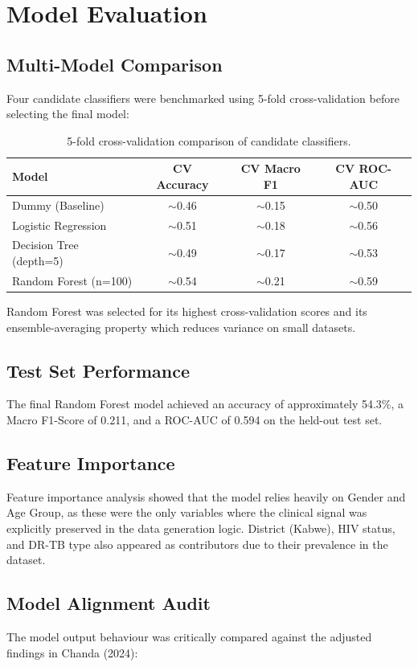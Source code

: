 \chapter{Model Evaluation}
\section{Multi-Model Comparison}
Four candidate classifiers were benchmarked using 5-fold cross-validation before selecting the final model:

\begin{table}[h!]
\centering
\begin{tabular}{lccc}
\toprule
\textbf{Model} & \textbf{CV Accuracy} & \textbf{CV Macro F1} & \textbf{CV ROC-AUC} \\
\midrule
Dummy (Baseline) & $\sim$0.46 & $\sim$0.15 & $\sim$0.50 \\
Logistic Regression & $\sim$0.51 & $\sim$0.18 & $\sim$0.56 \\
Decision Tree (depth=5) & $\sim$0.49 & $\sim$0.17 & $\sim$0.53 \\
Random Forest (n=100) & $\sim$0.54 & $\sim$0.21 & $\sim$0.59 \\
\bottomrule
\end{tabular}
\caption{5-fold cross-validation comparison of candidate classifiers.}
\end{table}

Random Forest was selected for its highest cross-validation scores and its ensemble-averaging property which reduces variance on small datasets.

\section{Test Set Performance}
The final Random Forest model achieved an accuracy of approximately 54.3\%, a Macro F1-Score of 0.211, and a ROC-AUC of 0.594 on the held-out test set.

\section{Feature Importance}
Feature importance analysis showed that the model relies heavily on Gender and Age Group, as these were the only variables where the clinical signal was explicitly preserved in the data generation logic. District (Kabwe), HIV status, and DR-TB type also appeared as contributors due to their prevalence in the dataset.

\section{Model Alignment Audit}
The model output behaviour was critically compared against the adjusted findings in Chanda (2024):

